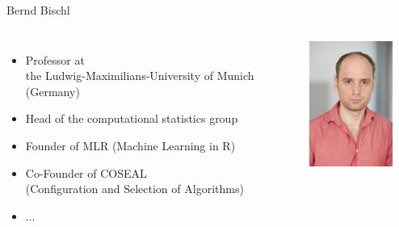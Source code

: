 \begin{frame}[c]{Bernd Bischl}


\begin{columns}
	
	
	\begin{itemize}
		\item Professor at\\ the Ludwig-Maximilians-University of Munich (Germany)
		\item Head of the computational statistics group
		\item Founder of MLR (Machine Learning in R)
		\item Co-Founder of COSEAL\\ (Configuration and Selection of Algorithms)
		\item ...
	\end{itemize}
	
	
	\includegraphics[width=0.8\textwidth]{images/bischl.jpg}
	
\end{columns}

\end{frame}
